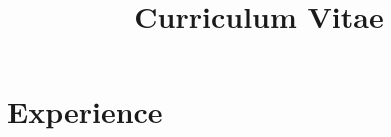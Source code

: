 \documentclass[11pt,a4paper,sans]{moderncv}        %
\title{Curriculum Vitae}                               %
\begin{document}
\makecvtitle


\section{Experience}
\end{document}
